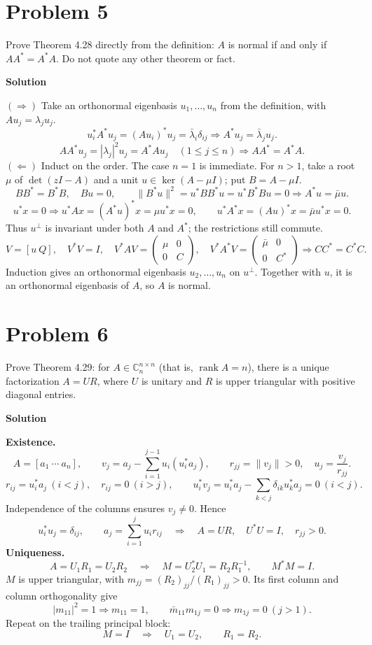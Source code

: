 \documentclass[UTF8,10pt,letterpaper,fontset=fandol]{ctexart}
\newcommand{\C}{\mathbb C}
\DeclareMathOperator{\rank}{rank}
\begin{document}
\section{Problem 5}
Prove Theorem 4.28 directly from the definition: $A$ is normal if and only if $AA^*=A^*A$. Do not quote any other theorem or fact.
\par{}\textbf{Solution}\par

\textbf{$(\Rightarrow)$}
Take an orthonormal eigenbasis $u_1,\ldots,u_n$ from the definition, with $Au_j=\lambda_ju_j$.
\[
 u_i^*A^*u_j=(Au_i)^*u_j=\bar\lambda_i\delta_{ij}
 \Longrightarrow A^*u_j=\bar\lambda_ju_j.
\]
\[
 AA^*u_j=|\lambda_j|^2u_j=A^*Au_j\quad(1\le j\le n)
 \Longrightarrow AA^*=A^*A.
\]
\textbf{$(\Leftarrow)$}
Induct on the order. The case $n=1$ is immediate. For $n>1$, take a root $\mu$ of $\det(zI-A)$ and a unit $u\in\ker(A-\mu I)$; put $B=A-\mu I$.
\[
 BB^*=B^*B,\quad Bu=0,\qquad
 \|B^*u\|^2=u^*BB^*u=u^*B^*Bu=0
 \Longrightarrow A^*u=\bar\mu u.
\]
\[
 u^*x=0\Longrightarrow
 u^*Ax=(A^*u)^*x=\mu u^*x=0,\qquad
 u^*A^*x=(Au)^*x=\bar\mu u^*x=0.
\]
Thus $u^\perp$ is invariant under both $A$ and $A^*$; the restrictions still commute.
\[
 V=[u\ Q],\quad V^*V=I,\quad V^*AV=\begin{pmatrix}\mu&0\\0&C\end{pmatrix},\quad
 V^*A^*V=\begin{pmatrix}\bar\mu&0\\0&C^*\end{pmatrix}
 \Longrightarrow CC^*=C^*C.
\]
 Induction gives an orthonormal eigenbasis $u_2,\ldots,u_n$ on $u^\perp$. Together with $u$, it is an orthonormal eigenbasis of $A$, so $A$ is normal.
\newpage
\section{Problem 6}
Prove Theorem 4.29: for $A\in\C_n^{n\times n}$ (that is, $\rank A=n$), there is a unique factorization $A=UR$, where $U$ is unitary and $R$ is upper triangular with positive diagonal entries.
\par{}\textbf{Solution}\par

\textbf{Existence.}
\[
 A=[a_1\ \cdots\ a_n],\qquad
 v_j=a_j-\sum_{i=1}^{j-1}u_i(u_i^*a_j),\qquad
 r_{jj}=\|v_j\|>0,\quad u_j=\frac{v_j}{r_{jj}}.
\]
\[
 r_{ij}=u_i^*a_j\ (i<j),\quad r_{ij}=0\ (i>j),\qquad
 u_i^*v_j=u_i^*a_j-\sum_{k<j}\delta_{ik}u_k^*a_j=0\ (i<j).
\]
Independence of the columns ensures $v_j\ne0$. Hence
\[
 u_i^*u_j=\delta_{ij},\qquad
 a_j=\sum_{i=1}^ju_ir_{ij}\quad\Longrightarrow\quad
 \boxed{A=UR,\quad U^*U=I,\quad r_{jj}>0}.
\]
\textbf{Uniqueness.}
\[
 A=U_1R_1=U_2R_2\quad\Longrightarrow\quad
 M=U_2^*U_1=R_2R_1^{-1},\qquad M^*M=I.
\]
$M$ is upper triangular, with $m_{jj}=(R_2)_{jj}/(R_1)_{jj}>0$. Its first column and column orthogonality give
\[
 |m_{11}|^2=1\Longrightarrow m_{11}=1,\qquad
 \bar m_{11}m_{1j}=0\Longrightarrow m_{1j}=0\ (j>1).
\]
Repeat on the trailing principal block:
\[
 M=I\quad\Longrightarrow\quad U_1=U_2,\qquad R_1=R_2.
\]
\end{document}
